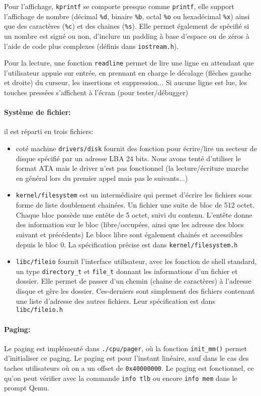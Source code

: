 \documentclass[12pt,a4paper]{article}
\begin{document}
Pour l'affichage, \texttt{kprintf} se comporte presque comme \texttt{printf}, elle support l'affichage de nombre (décimal \texttt{\%d}, binaire \texttt{\%b}, octal \texttt{\%o} ou hexadécimal \texttt{\%x}) ainsi que des caractères (\texttt{\%c}) et des chaines (\texttt{\%s}). Elle permet également de spécifié si un nombre est signé ou non, d'inclure un padding à base d'espace ou de zéros à l'aide de code plus complexes (définis dans \texttt{iostream.h}).


Pour la lecture, une fonction \texttt{readline} permet de lire une ligne en attendant que l'utilisateur appuie sur entrée, en prennant en charge le décalage (flèches gauche et droite) du curseur, les insertions et suppression... Si aucune ligne est lue, les touches pressées s'affichent à l'écran (pour tester/débugger)


\paragraph{Système de fichier:} il est réparti en trois fichiers:
\begin{itemize}
\item coté machine \texttt{drivers/disk} fournit des fonction pour écrire/lire un secteur de disque spécifié par un adresse LBA 24 bits. Nous avons tenté d'utiliser le format ATA mais le driver n'est pas fonctionnel (la lecture/écriture marche en général lors du premier appel mais pas le suivants...)
\item \texttt{kernel/filesystem} est un intermédiaire qui permet d'écrire les fichiers sous forme de liste doublement chainées. Un fichier une suite de bloc de 512 octet. Chaque bloc possède une entête de 5 octet, suivi du contenu. L'entête donne des information sur le bloc (libre/occupées, ainsi que les adresse des blocs suivant et précédents) Le blocs libre sont également chainés et accessibles depuis le bloc 0. La spécification précise est dans \texttt{kernel/filesystem.h}
\item \texttt{libc/fileio} fournit l'interface utilisateur, avec les fonction de shell standard, un type \texttt{directory\_t} et \texttt{file\_t} donnant les informations d'un fichier et dossier. Elle permet de passer d'un chemin (chaine de caractères) à l'adresse disque et gère les dossier. Ces-derniers sont simplement des fichiers contenant une liste d'adresse des autres fichiers. Leur spécification est dans \texttt{libc/fileio.h}
\end{itemize}
\paragraph{Paging:} 
    Le paging est implémenté dans \texttt{./cpu/pager}, où la fonction \texttt{init\_mm()} permet d'initialiser ce paging. Le paging est pour l'instant linéaire, sauf dans le cas des taches utilisateurs où on a un offset de \texttt{0x40000000}.
    Le paging est fonctionnel, ce qu'on peut vérifier avec la commande \texttt{info tlb} ou encore \texttt{info mem} dans le prompt Qemu.
    
\end{document}
